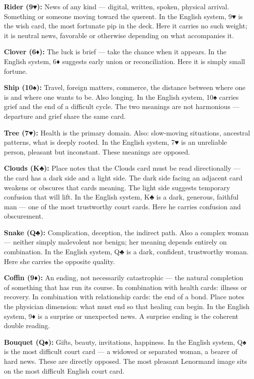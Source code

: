 \textbf{Rider (9♥):} News of any kind --- digital, written, spoken, physical arrival. Something or someone moving toward the querent. In the English system, 9♥ is the wish card, the most fortunate pip in the deck. Here it carries no such weight; it is neutral news, favorable or otherwise depending on what accompanies it.

\textbf{Clover (6♦):} The luck is brief --- take the chance when it appears. In the English system, 6♦ suggests early union or reconciliation. Here it is simply small fortune.

\textbf{Ship (10♠):} Travel, foreign matters, commerce, the distance between where one is and where one wants to be. Also longing. In the English system, 10♠ carries grief and the end of a difficult cycle. The two meanings are not harmonious --- departure and grief share the same card.

\textbf{Tree (7♥):} Health is the primary domain. Also: slow-moving situations, ancestral patterns, what is deeply rooted. In the English system, 7♥ is an unreliable person, pleasant but inconstant. These meanings are opposed.

\textbf{Clouds (K♣):} Place notes that the Clouds card must be read directionally --- the card has a dark side and a light side. The dark side facing an adjacent card weakens or obscures that card\textquotesingle s meaning. The light side suggests temporary confusion that will lift. In the English system, K♣ is a dark, generous, faithful man --- one of the most trustworthy court cards. Here he carries confusion and obscurement.

\textbf{Snake (Q♣):} Complication, deception, the indirect path. Also a complex woman --- neither simply malevolent nor benign; her meaning depends entirely on combination. In the English system, Q♣ is a dark, confident, trustworthy woman. Here she carries the opposite quality.

\textbf{Coffin (9♦):} An ending, not necessarily catastrophic --- the natural completion of something that has run its course. In combination with health cards: illness or recovery. In combination with relationship cards: the end of a bond. Place notes the physician dimension: what must end so that healing can begin. In the English system, 9♦ is a surprise or unexpected news. A surprise ending is the coherent double reading.

\textbf{Bouquet (Q♠):} Gifts, beauty, invitations, happiness. In the English system, Q♠ is the most difficult court card --- a widowed or separated woman, a bearer of hard news. These are directly opposed. The most pleasant Lenormand image sits on the most difficult English court card.

